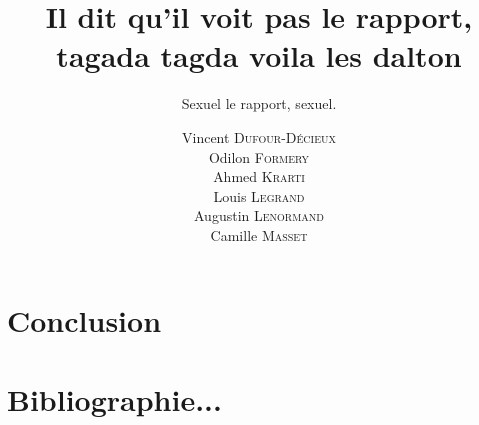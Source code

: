 \documentclass[12pt]{article}
\title{Il dit qu'il voit pas le rapport, tagada tagda voila les dalton}
\subtitle{Sexuel le rapport, sexuel.}
\author{ Vincent \textsc{Dufour-Décieux} \\ Odilon \textsc{Formery} \\ Ahmed \textsc{Krarti} \\ Louis \textsc{Legrand} \\ Augustin \textsc{Lenormand} \\ Camille \textsc{Masset} }
\begin{document}
\maketitle

\newpage
\renewcommand{\thepage}{}
\thispagestyle{empty}
\null
\newpage

\renewcommand{\thepage}{\arabic{page}}
\setcounter{page}{1}











\section*{Conclusion}

\section*{Bibliographie...}
\end{document}
